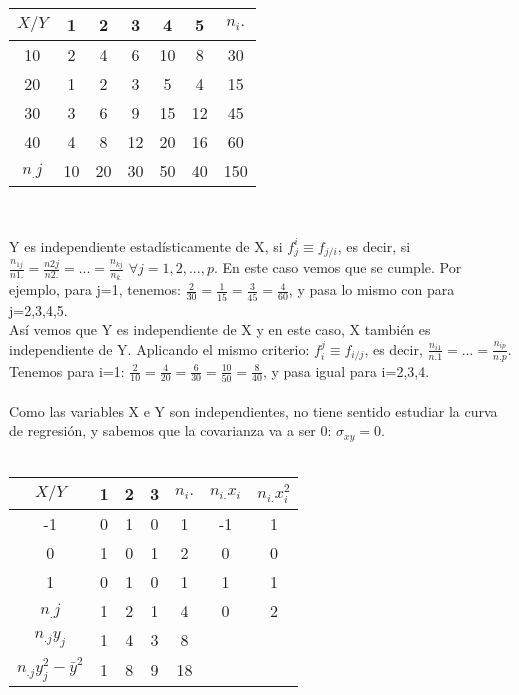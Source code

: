 \documentclass{article}
\begin{document}
    \begin{center}
    \begin{tabular}{| c | c | c | c | c | c | c |}
        \hline
        $X / Y$ & 1 & 2 & 3 & 4 & 5 & $n_i.$\\ \hline
        10 & 2 & 4 & 6 & 10 & 8 & 30 \\
        20 & 1 & 2 & 3 & 5 & 4 & 15 \\
        30 & 3 & 6 & 9 & 15 & 12 & 45 \\
        40 & 4 & 8 & 12 & 20 & 16 & 60 \\
        $n_.j$ & 10 & 20 & 30 & 50 & 40 & 150 \\       \hline
    \end{tabular} \\ 
    \end{center}
    Y es independiente estadísticamente de X, si $f_j^i \equiv f_{j/i}$, es decir, si $\frac{n_{1j}}{n1.} = \frac{n2j}{n2.} = ... = \frac{n_{kj}}{n_{k.}}$ $ \forall j = 1,2,...,p $. En este caso vemos que se cumple. Por ejemplo, para j=1, tenemos: $\frac{2}{30} = \frac{1}{15} = \frac{3}{45} = \frac{4}{60}$, y pasa lo mismo con para j=2,3,4,5. \\
    Así vemos que Y es independiente de X y en este caso, X también es independiente de Y. Aplicando el mismo criterio: $f_i^j \equiv f_{i/j}$, es decir, $\frac{n_{i1}}{n.1} = ... = \frac{n_{ip}}{n.p}$. Tenemos para i=1: $\frac{2}{10} = \frac{4}{20} = \frac{6}{30} = \frac{10}{50} = \frac{8}{40}$, y pasa igual para i=2,3,4. \\ \\
    Como las variables X e Y son independientes, no tiene sentido estudiar la curva de regresión, y sabemos que la covarianza va a ser 0: $\sigma_{xy} = 0$. \\ \\
    \begin{center}
    \begin{tabular}{| c | c | c | c | c | c | c |}
        \hline
        $X / Y$ & 1 & 2 & 3 & $n_i.$ & $n_{i.}x_i$ & $n_{i.}x_i^2$\\ \hline
        -1 & 0 & 1 & 0 & 1 & -1 & 1 \\
        0 & 1 & 0 & 1 & 2 & 0 & 0 \\
        1 & 0 & 1 & 0 & 1 & 1 & 1 \\
        $n_.j$ & 1 & 2 & 1 & 4 & 0 & 2 \\
        $n_{.j}y_j$ & 1 & 4 & 3 & 8 & & \\
        $n_{.j}y_j^2 - \bar{y}^2$ & 1 & 8 & 9 & 18 & & \\
        \hline
    \end{tabular} \\ 
    \end{center}
\end{document}
